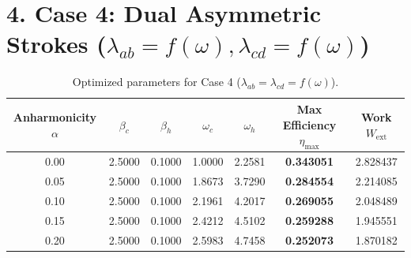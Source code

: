 \documentclass[11pt,a4paper]{article}
\begin{document}
\section*{4. Case 4: Dual Asymmetric Strokes ($\lambda_{ab} = f(\omega), \lambda_{cd} = f(\omega)$)}
\begin{table}[h!]
\centering
\caption{Optimized parameters for Case 4 ($\lambda_{ab}=\lambda_{cd}=f(\omega)$).}
\begin{tabular}{ccccccc}
\toprule
\textbf{Anharmonicity $\alpha$} & $\beta_c$ & $\beta_h$ & $\omega_c$ & $\omega_h$ & \textbf{Max Efficiency $\eta_{\mathrm{max}}$} & \textbf{Work $W_{\mathrm{ext}}$} \\
\midrule
0.00 & 2.5000 & 0.1000 & 1.0000 & 2.2581 & \textbf{0.343051} & 2.828437 \\
0.05 & 2.5000 & 0.1000 & 1.8673 & 3.7290 & \textbf{0.284554} & 2.214085 \\
0.10 & 2.5000 & 0.1000 & 2.1961 & 4.2017 & \textbf{0.269055} & 2.048489 \\
0.15 & 2.5000 & 0.1000 & 2.4212 & 4.5102 & \textbf{0.259288} & 1.945551 \\
0.20 & 2.5000 & 0.1000 & 2.5983 & 4.7458 & \textbf{0.252073} & 1.870182 \\
\bottomrule
\end{tabular}
\end{table}
\end{document}
